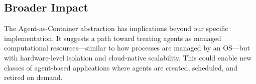 \subsection{Broader Impact}
The Agent-as-Container abstraction has implications beyond our specific implementation. It suggests a path toward treating agents as managed computational resources---similar to how processes are managed by an OS---but with hardware-level isolation and cloud-native scalability. This could enable new classes of agent-based applications where agents are created, scheduled, and retired on demand.
